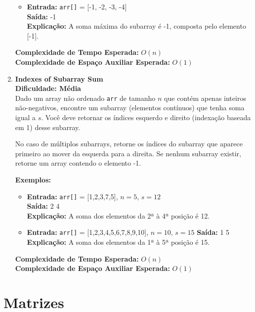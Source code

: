 \documentclass[a4paper,12pt]{article}
\begin{document}
\begin{enumerate}
\begin{itemize}
        \item \textbf{Entrada:} \texttt{arr[]} = [-1, -2, -3, -4] \\
        \textbf{Saída:} -1 \\
        \textbf{Explicação:} A soma máxima do subarray é -1, composta pelo elemento [-1].
    \end{itemize}
    
    \textbf{Complexidade de Tempo Esperada:} \( O(n) \) \\
    \textbf{Complexidade de Espaço Auxiliar Esperada:} \( O(1) \)

    \item \textbf{Indexes of Subarray Sum} \\
    \textbf{Dificuldade: Média} \\
    Dado um array não ordenado \texttt{arr} de tamanho \( n \) que contém apenas inteiros não-negativos, encontre um subarray (elementos contínuos) que tenha soma igual a \( s \). Você deve retornar os índices esquerdo e direito (indexação baseada em 1) desse subarray.

    No caso de múltiplos subarrays, retorne os índices do subarray que aparece primeiro ao mover da esquerda para a direita. Se nenhum subarray existir, retorne um array contendo o elemento -1.

    \textbf{Exemplos:}
    \begin{itemize}
        \item \textbf{Entrada:} \texttt{arr[]} = [1,2,3,7,5], \( n = 5 \), \( s = 12 \) \\
        \textbf{Saída:} 2 4 \\
        \textbf{Explicação:} A soma dos elementos da 2ª à 4ª posição é 12.
        
        \item \textbf{Entrada:} \texttt{arr[]} = [1,2,3,4,5,6,7,8,9,10], \( n = 10 \), \( s = 15 \)
        \textbf{Saída:} 1 5 \\
        \textbf{Explicação:} A soma dos elementos da 1ª à 5ª posição é 15.
    \end{itemize}
    
    \textbf{Complexidade de Tempo Esperada:} \( O(n) \) \\
    \textbf{Complexidade de Espaço Auxiliar Esperada:} \( O(1) \)

\end{enumerate}

\section{Matrizes}
\end{document}
